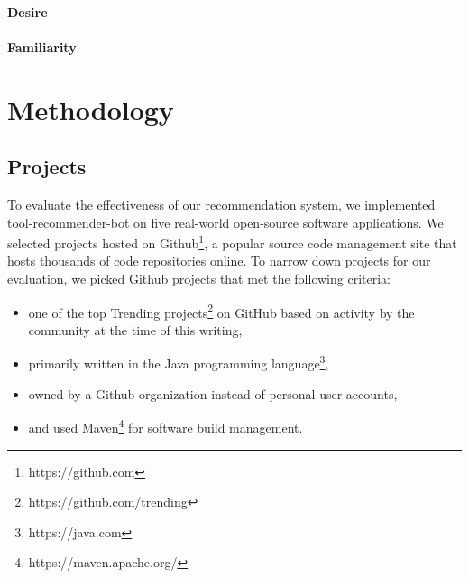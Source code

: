 \documentclass[conference]{IEEEtran}
\newcommand{\tool}{tool-recommender-bot }
\begin{document}
\paragraph{Desire}

\paragraph{Familiarity}

\section{Methodology}

\subsection{Projects}

To evaluate the effectiveness of our recommendation system, we implemented \tool on five real-world open-source software applications. We selected projects hosted on Github\footnote{https://github.com}, a popular source code management site that hosts thousands of code repositories online. To narrow down projects for our evaluation, we picked Github projects that met the following criteria:

\begin{itemize}
\item one of the top Trending projects\footnote{https://github.com/trending} on GitHub based on activity by the community at the time of this writing,
\item primarily written in the Java programming language\footnote{https://java.com},
\item owned by a Github organization instead of personal user accounts,
\item and used Maven\footnote{https://maven.apache.org/} for software build management.
\end{itemize}
\end{document}
